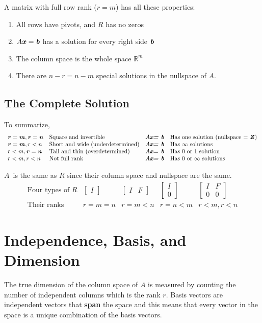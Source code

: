 \documentclass[12pt, letterpaper]{article}
\newcommand{\R}[1]{$\mathbb{R}^{#1}$}
\newcommand{\V}[1]{\textbf{\textit{#1}}}
\newcommand{\A}{$A$}
\newcommand{\x}{\textbf{\textit{x}}}
\newcommand{\B}{\textbf{\textit{b}}}
\newcommand{\system}{\textbf{\textit{\A \x = \B}}}
\theoremstyle{definition}
\begin{document}
		\noindent A matrix with full row rank ($r=m$) has all these properties:
			\begin{enumerate}
				\item All rows have pivots, and $R$ has no zeros
				\item $A\V{x} = \V{b}$ has a solution for every right side $\V{b}$
				\item The column space is the whole space \R{m}
				\item There are $n - r = n - m$ special solutions in the nullspace of $A.$
			\end{enumerate}
\subsection{The Complete Solution}
	To summarize, 
	$$
	\begin{array}{llcl}
		\V{r} = \V{m}, \V{r}=\V{n} & \text{Square and invertible} & \system  & \text{Has one solution (nullspace = \V{Z})}\\
		\V{r}=\V{m}, r<n &  \text{Short and wide (underdetermined)} & \system & \text{Has $\infty$ solutions}\\
		r<m, \V{r}=\V{n} &  \text{Tall and thin (overdetermined)} & \system & \text{Has 0 or 1 solution}\\
		r<m, r<n &  \text{Not full rank} & \system & \text{Has 0 or $\infty$ solutions}
	\end{array} 
	$$
	
	\noindent \A\, is the same as $R$ since their column space and nullspace are the same. 
	$$
	\begin{array}{lcccc}
		\text{Four types of $R$} & \begin{bmatrix} I \end{bmatrix}  & \begin{bmatrix} I & F \end{bmatrix} & \begin{bmatrix} I \\ 0 \end{bmatrix} & \begin{bmatrix} I & F \\ 0 & 0 \end{bmatrix}\\
		\text{Their ranks} & r = m = n & r = m < n & r = n < m & r < m, r < n
	\end{array} 
	$$

\section{Independence, Basis, and Dimension}
	The true dimension of the column space of $A$ is measured by counting the number of independent columns which is the rank $r$. Basis vectors are independent vectors that \textbf{span} the space and this means that every vector in the space is a unique combination of the basis vectors.
	
\end{document}
